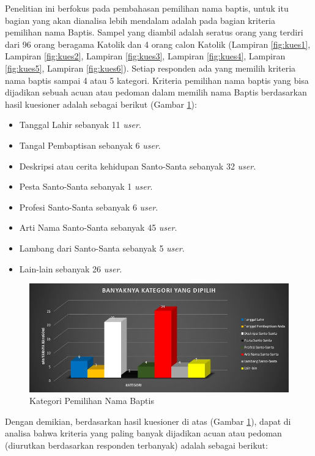 Penelitian ini berfokus pada pembahasan pemilihan nama baptis, untuk itu bagian yang akan dianalisa lebih mendalam adalah pada bagian kriteria pemilihan nama Baptis. Sampel yang diambil adalah seratus orang yang terdiri dari 96 orang beragama Katolik dan 4 orang calon Katolik (Lampiran \ref{fig:kues1}, Lampiran \ref{fig:kues2}, Lampiran \ref{fig:kues3}, Lampiran \ref{fig:kues4}, Lampiran \ref{fig:kues5}, Lampiran \ref{fig:kues6}). Setiap responden ada yang memilih kriteria nama baptis sampai 4 atau 5 kategori. Kriteria pemilihan nama baptis yang bisa dijadikan sebuah acuan atau pedoman dalam memilih nama Baptis berdasarkan hasil kuesioner adalah sebagai berikut (Gambar \ref{fig:Capture}):

\begin{itemize}
			\item Tanggal Lahir sebanyak 11 \textit{user}.
			\item Tangal Pembaptisan sebanyak 6 \textit{user}.
			\item Deskripsi atau cerita kehidupan Santo-Santa sebanyak 32 \textit{user}.
			\item Pesta Santo-Santa sebanyak 1 \textit{user}.
			\item Profesi Santo-Santa sebanyak 6 \textit{user}.
			\item Arti Nama Santo-Santa sebanyak 45 \textit{user}.
			\item Lambang dari Santo-Santa sebanyak 5 \textit{user}.
			\item Lain-lain sebanyak 26 \textit{user}.
		\end{itemize}
		
	\begin{figure}[htbp]
		\centering
			\includegraphics[scale=0.7]{Gambar/Capture.JPG}
			\caption{Kategori Pemilihan Nama Baptis}
		\label{fig:Capture}
	\end{figure}

	Dengan demikian, berdasarkan hasil kuesioner di atas (Gambar \ref{fig:Capture}), dapat di analisa bahwa kriteria yang paling banyak dijadikan acuan atau pedoman (diurutkan berdasarkan responden terbanyak) adalah sebagai berikut:
	
